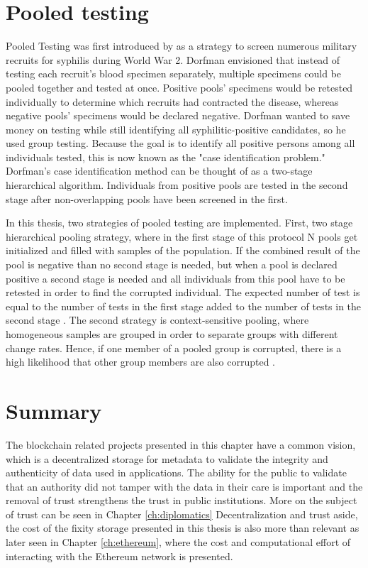 \section{Pooled testing}\label{sec:pooled}
Pooled Testing was first introduced by \cite{dorfman1943detection} as a strategy to screen numerous military recruits for syphilis during World War 2. Dorfman envisioned that instead of testing each recruit's blood specimen separately, multiple specimens could be pooled together and tested at once. Positive pools' specimens would be retested individually to determine which recruits had contracted the disease, whereas negative pools' specimens would be declared negative. Dorfman wanted to save money on testing while still identifying all syphilitic-positive candidates, so he used group testing. Because the goal is to identify all positive persons among all individuals tested, this is now known as the "case identification problem." Dorfman's case identification method can be thought of as a two-stage hierarchical algorithm. Individuals from positive pools are tested in the second stage after non-overlapping pools have been screened in the first.

In this thesis, two strategies of pooled testing are implemented. 
First, two stage hierarchical pooling strategy, where in the first stage of this protocol N pools get initialized and filled with samples of the population. If the combined result of the pool is negative than no second stage is needed, but when a pool is declared positive a second stage is needed and all individuals from this pool have to be retested in order to find the corrupted individual. The expected number of test is equal to the number of tests in the first stage added to the number of tests in the second stage \cite[3]{nianogo2021optimal}.
The second strategy is context-sensitive pooling, where homogeneous samples are grouped in order to separate groups with different change rates. Hence, if one member of a pooled group is corrupted, there is a high likelihood that other group members are also corrupted \cite[3]{deckert2020simulation}.

\section{Summary}
The blockchain related projects presented in this chapter have a common vision, which is a decentralized storage for metadata to validate the integrity and authenticity of data used in applications. The ability for the public to validate that an authority did not tamper with the data in their care is important and the removal of trust strengthens the trust in public institutions. More on the subject of trust can be seen in Chapter \ref{ch:diplomatics}
Decentralization and trust aside, the cost of the fixity storage presented in this thesis is also more than relevant as later seen in Chapter \ref{ch:ethereum}, where the cost and computational effort of interacting with the Ethereum network is presented.
